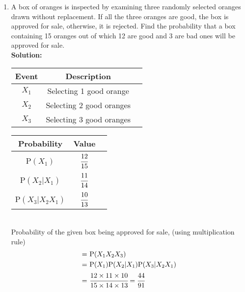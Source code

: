 \documentclass[journal,12pt,twocolumn]{IEEEtran}
\newcommand{\solution}{\noindent \textbf{Solution: }}
\newcommand\T{\rule{0pt}{2.6ex}}       %
\begin{document}
\begin{enumerate}[label=13.\arabic{enumi}.\arabic{enumii}]

\setcounter{enumi}{1}
\setcounter{enumii}{3}
\item A box of oranges is inspected by examining three randomly selected oranges drawn without replacement. If all the three oranges are good, the box is approved for sale, otherwise, it is rejected. Find the probability that a box containing 15 oranges out of which 12 are good and 3 are bad ones will be approved for sale.\\
	\solution
	\begin{table}[h!]
	\small
	\centering
		\begin{tabular}{|c|c|c|} \hline
			\textbf{Event}&\textbf{Description}\\ \hline
			$X_1$&Selecting 1 good orange  \\ \hline 
			$X_2$&Selecting 2 good oranges \\ \hline
			$X_3$&Selecting 3 good oranges \\ \hline
		\end{tabular}
	\end{table}
	\begin{table}[h!]
	\small
	\centering
		\begin{tabular}[20pt]{|c|c|c|} \hline
			\textbf{Probability}&\textbf{Value}\\ \hline
			P$(X_1)$ \T  &$\cfrac{12}{15}$  \\[1.5ex] \hline
			P$(X_2|X_1)$&$\cfrac{11}{14}$  \\[1.5ex] \hline
			P$(X_3|X_2X_1)$&$\cfrac{10}{13}$  \\[1.5ex] \hline
		\end{tabular}
	\end{table}\\
		Probability of the given box being approved for sale, (using multiplication rule)
	\begin{align}
		=& \text{ }\text{P}(X_1 X_2 X_3) \\
		=& \text{ }\text{P}(X_1)\text{P}(X_2|X_1)\text{P}(X_3|X_2X_1) \\
		=& \text{ }\cfrac{12 \times 11 \times 10}{15 \times 14 \times 13} = \cfrac{44}{91}
	\end{align}


\end{enumerate}
\end{document}

